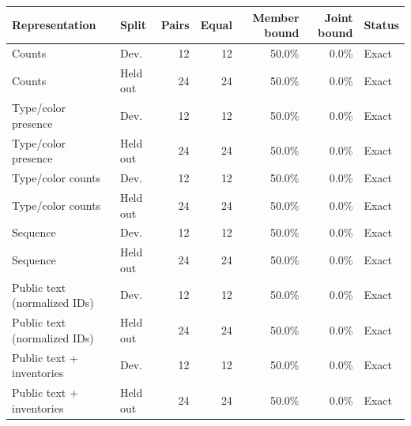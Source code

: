 \begin{tabular}{llrrrrl}\toprule
Representation & Split & Pairs & Equal & Member bound & Joint bound & Status\\\midrule
Counts & Dev. & 12 & 12 & 50.0\% & 0.0\% & Exact\\
Counts & Held out & 24 & 24 & 50.0\% & 0.0\% & Exact\\
Type/color presence & Dev. & 12 & 12 & 50.0\% & 0.0\% & Exact\\
Type/color presence & Held out & 24 & 24 & 50.0\% & 0.0\% & Exact\\
Type/color counts & Dev. & 12 & 12 & 50.0\% & 0.0\% & Exact\\
Type/color counts & Held out & 24 & 24 & 50.0\% & 0.0\% & Exact\\
Sequence & Dev. & 12 & 12 & 50.0\% & 0.0\% & Exact\\
Sequence & Held out & 24 & 24 & 50.0\% & 0.0\% & Exact\\
Public text (normalized IDs) & Dev. & 12 & 12 & 50.0\% & 0.0\% & Exact\\
Public text (normalized IDs) & Held out & 24 & 24 & 50.0\% & 0.0\% & Exact\\
Public text + inventories & Dev. & 12 & 12 & 50.0\% & 0.0\% & Exact\\
Public text + inventories & Held out & 24 & 24 & 50.0\% & 0.0\% & Exact\\
\bottomrule\end{tabular}
